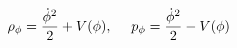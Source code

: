 \begin{equation}
\rho_{\phi}={ \dot{\phi}^2 \over 2}+V(\phi),~~~~p_{\phi}={ \dot{\phi}^2 \over 2}-V(\phi)
\end{equation}

